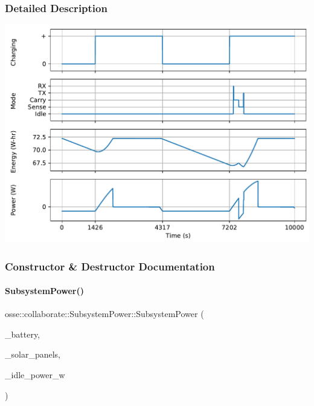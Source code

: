 \subsubsection{Detailed Description}
  
\begin{DoxyImageNoCaption}
  \mbox{\includegraphics[width=\textwidth]{power}}
\end{DoxyImageNoCaption}
 

\subsubsection{Constructor \& Destructor Documentation}
\mbox{\label{classosse_1_1collaborate_1_1_subsystem_power_a7dafdf11fd2f0d904353e2f385c905bc}} 
\paragraph{\texorpdfstring{Subsystem\+Power()}{SubsystemPower()}}
{\footnotesize\ttfamily osse\+::collaborate\+::\+Subsystem\+Power\+::\+Subsystem\+Power (\begin{DoxyParamCaption}\item[{const \hyperlink{classosse_1_1collaborate_1_1_battery}{Battery} \&}]{\+\_\+battery,  }\item[{const std\+::vector$<$ \hyperlink{classosse_1_1collaborate_1_1_solar_panel}{Solar\+Panel} $>$}]{\+\_\+solar\+\_\+panels,  }\item[{const double \&}]{\+\_\+idle\+\_\+power\+\_\+w }\end{DoxyParamCaption})}



